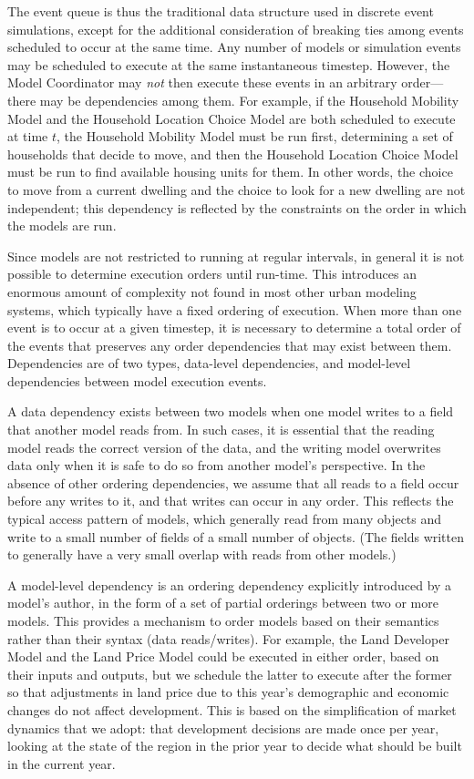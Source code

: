 The event queue is thus the traditional data structure used in discrete
event simulations, except for the additional consideration of breaking ties
among events scheduled to occur at the same time.  Any number of models or
simulation events may be scheduled to execute at the same instantaneous
timestep.  However, the Model Coordinator may \emph{not} then execute these
events in an arbitrary order---there may be dependencies among them.  For
example, if the Household Mobility Model and the Household Location Choice
Model are both scheduled to execute at time $t$, the Household Mobility
Model must be run first, determining a set of households that decide to
move, and then the Household Location Choice Model must be run to find
available housing units for them.  In other words, the choice to move from
a current dwelling and the choice to look for a new dwelling are not
independent; this dependency is reflected by the constraints on the order
in which the models are run.

Since models are not restricted to running at regular intervals, in general
it is not possible to determine execution orders until run-time.  This
introduces an enormous amount of complexity not found in most other urban
modeling systems, which typically have a fixed ordering of execution.  When
more than one event is to occur at a given timestep, it is necessary to
determine a total order of the events that preserves any order dependencies
that may exist between them.  Dependencies are of two types, data-level
dependencies, and model-level dependencies between model execution events.

A data dependency exists between two models when one model writes to a
field that another model reads from.  In such cases, it is essential that
the reading model reads the correct version of the data, and the writing
model overwrites data only when it is safe to do so from another model's
perspective.  In the absence of other ordering dependencies, we assume that
all reads to a field occur before any writes to it,
and that writes can occur in any order.
This reflects the typical access pattern of models, which generally read
from many objects and write to a small number of fields of a small number
of objects.  (The fields written to generally have a very small overlap
with reads from other models.)

A model-level dependency is an ordering dependency explicitly introduced by
a model's author, in the form of a set of partial orderings between two or
more models.  This provides a mechanism to order models based on their
semantics rather than their syntax (data reads/writes).  For example, the
Land Developer Model and the Land Price Model could be executed in either
order, based on their inputs and outputs, but we schedule the latter to
execute after the former so that adjustments in land price due to this
year's demographic and economic changes do not affect development.  This is
based on the simplification of market dynamics that we adopt: that
development decisions are made once per year, looking at the state of the
region in the prior year to decide what should be built in the current
year.

